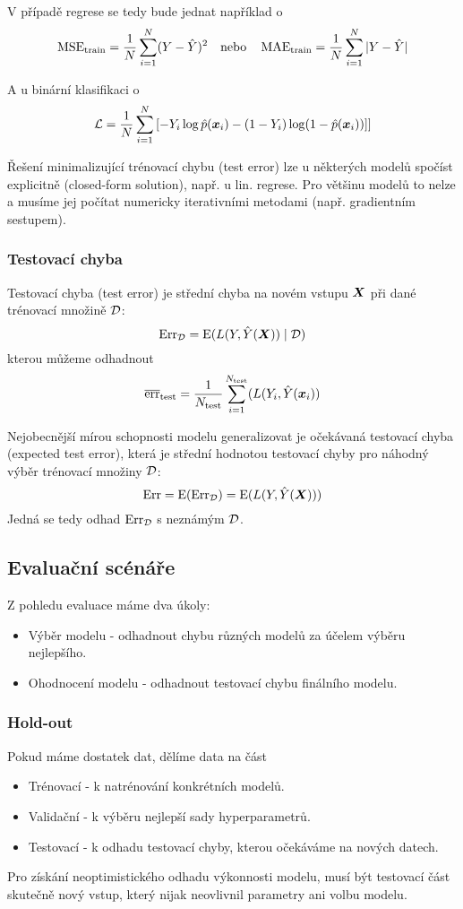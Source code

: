 V případě regrese se tedy bude jednat například o
\[
    \operatorname{MSE}_{\text{train}} = \frac{1}{N} \sum_{i=1}^{N} (Y - \hat{Y})^2
    \quad \text{nebo} \quad
    \operatorname{MAE}_{\text{train}} = \frac{1}{N} \sum_{i=1}^{N} |Y - \hat{Y}|
\]

A u binární klasifikaci o
\[
    \mathcal{L} = \frac{1}{N} \sum_{i=1}^{N}
    \left[
        - Y_i\log\hat{p}(\bm{x}_i) - (1-Y_i)\log(1-\hat{p}(\bm{x}_i))]
    \right]
\]

Řešení minimalizující trénovací chybu (test error) lze u některých modelů spočíst explicitně (closed-form solution), např. u lin. regrese. Pro většinu modelů to nelze a musíme jej počítat numericky iterativními metodami (např. gradientním sestupem).

\subsubsection{Testovací chyba}

Testovací chyba (test error) je střední chyba na novém vstupu $\bm{X}$ při dané trénovací množině $\mathcal{D}$:
\[
    \text{Err}_{\mathcal{D}} = \operatorname{E} (L(Y, \hat{Y}(\bm{X})) \mid \mathcal{D})
\]
kterou můžeme odhadnout
\[
    \overline{\text{err}}_{\text{test}} = \frac{1}{N_{\text{test}}} \sum_{i=1}^{N_{\text{test}}} (L(Y_i, \hat{Y}(\bm{x}_i))
\]

Nejobecnější mírou schopnosti modelu generalizovat je očekávaná testovací chyba (expected test error), která je střední hodnotou testovací chyby pro náhodný výběr trénovací množiny $\mathcal{D}$:
\[
    \text{Err} = \operatorname{E} (\text{Err}_{\mathcal{D}}) = \operatorname{E} (L(Y, \hat{Y}(\bm{X})))
\]
Jedná se tedy odhad $\text{Err}_{\mathcal{D}}$ s neznámým $\mathcal{D}$.

\subsection{Evaluační scénáře}

Z pohledu evaluace máme dva úkoly:
\begin{itemize}
    \item Výběr modelu - odhadnout chybu různých modelů za účelem výběru nejlepšího.
    \item Ohodnocení modelu - odhadnout testovací chybu finálního modelu.
\end{itemize}

\subsubsection{Hold-out}

Pokud máme dostatek dat, dělíme data na část
\begin{itemize}
    \item Trénovací - k natrénování konkrétních modelů.
    \item Validační - k výběru nejlepší sady hyperparametrů.
    \item Testovací - k odhadu testovací chyby, kterou očekáváme na nových datech.
\end{itemize}
Pro získání neoptimistického odhadu výkonnosti modelu, musí být testovací část skutečně nový vstup, který nijak neovlivnil parametry ani volbu modelu.

